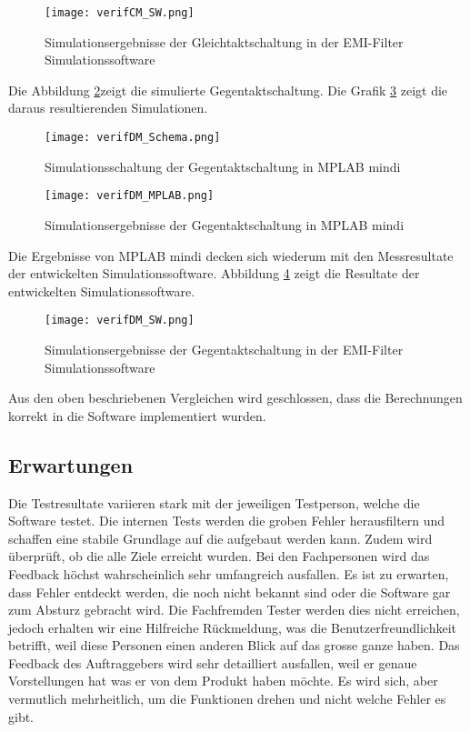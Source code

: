 \begin{figure}[H]
	\centering
	\texttt{[image: verifCM\_SW.png]}
	\caption{Simulationsergebnisse der Gleichtaktschaltung in der EMI-Filter Simulationssoftware}
	\label{fig:verifCM_SW}
\end{figure}

\newpage

Die Abbildung \ref{fig:verifDM_Schema}zeigt die simulierte Gegentaktschaltung. Die Grafik \ref{fig:verifDM_MPLAB} zeigt die daraus resultierenden Simulationen.

\begin{figure}[H]
	\centering
	\texttt{[image: verifDM\_Schema.png]}
	\caption{Simulationsschaltung der Gegentaktschaltung in MPLAB mindi}
	\label{fig:verifDM_Schema}
\end{figure}

\newpage

\begin{figure}[H]
	\centering
	\texttt{[image: verifDM\_MPLAB.png]}
 	\caption{Simulationsergebnisse der Gegentaktschaltung in MPLAB mindi}
	\label{fig:verifDM_MPLAB}
\end{figure}

Die Ergebnisse von MPLAB mindi decken sich wiederum mit den Messresultate der entwickelten Simulationssoftware. Abbildung \ref{fig:verifDM_SW} zeigt die Resultate der entwickelten Simulationssoftware.

\begin{figure}[H]
	\centering
	\texttt{[image: verifDM\_SW.png]}
	\caption{Simulationsergebnisse der Gegentaktschaltung in der EMI-Filter Simulationssoftware}
	\label{fig:verifDM_SW}
\end{figure}

Aus den oben beschriebenen Vergleichen wird geschlossen, dass die Berechnungen korrekt in die Software implementiert wurden.

\newpage

\subsection{Erwartungen} \label{subsec:validierung}

Die Testresultate variieren stark mit der jeweiligen Testperson, welche die Software testet.
Die internen Tests werden die groben Fehler herausfiltern und schaffen eine stabile Grundlage auf die aufgebaut werden kann. Zudem wird überprüft, ob die alle Ziele erreicht wurden.
Bei den Fachpersonen wird das Feedback höchst wahrscheinlich sehr umfangreich   ausfallen. Es ist zu erwarten, dass Fehler entdeckt werden, die noch nicht bekannt sind oder die Software gar zum Absturz gebracht wird. 
Die Fachfremden Tester werden dies nicht erreichen, jedoch erhalten wir eine Hilfreiche Rückmeldung, was die Benutzerfreundlichkeit betrifft, weil diese Personen einen anderen Blick auf das grosse ganze haben. 
Das Feedback des Auftraggebers wird sehr detailliert ausfallen, weil er genaue Vorstellungen hat was er von dem Produkt haben möchte. Es wird sich, aber vermutlich mehrheitlich, um die Funktionen drehen und nicht welche Fehler es gibt. 





